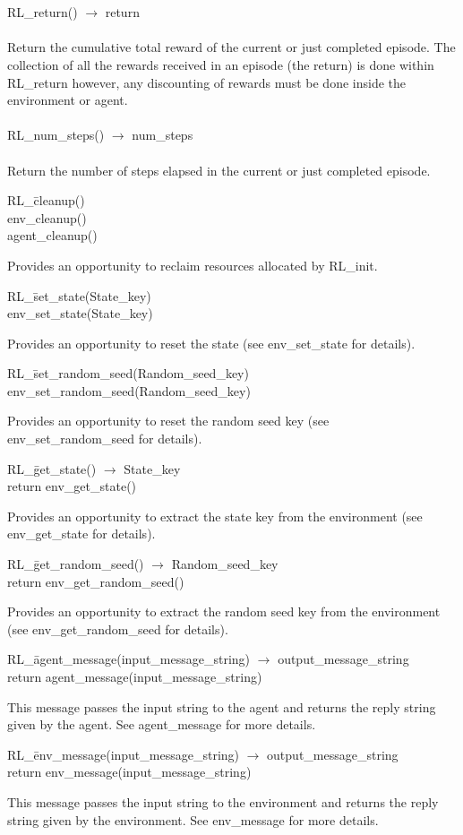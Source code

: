 \documentclass[11pt]{article}
\begin{document}
\\\\
RL\_return() $\rightarrow$ return
\\\\
Return the cumulative total reward of the current or just completed episode.  The collection of all the rewards received in an episode (the return) is done within RL\_return however, any discounting of rewards must be done inside the environment or agent.
\\\\
RL\_num\_steps() $\rightarrow$ num\_steps
\\\\
Return the number of steps elapsed in the current or just completed episode.
\begin{tabbing}
RL\_\=cleanup()\\
\>env\_cleanup()\\
\>agent\_cleanup()
\end{tabbing}
Provides an opportunity to reclaim resources allocated by RL\_init.
\begin{tabbing}
RL\_\=set\_state(State\_key)\\
\>env\_set\_state(State\_key)    
\end{tabbing}
Provides an opportunity to reset the state (see env\_set\_state for details).
\begin{tabbing}
RL\_\=set\_random\_seed(Random\_seed\_key)\\
\>env\_set\_random\_seed(Random\_seed\_key)
\end{tabbing}
Provides an opportunity to reset the random seed key (see env\_set\_random\_seed for details).
\begin{tabbing}
RL\_\=get\_state() $\rightarrow$ State\_key\\
\>return env\_get\_state()  
\end{tabbing}
Provides an opportunity to extract the state key from the environment (see env\_get\_state for details).
\begin{tabbing}
RL\_\=get\_random\_seed() $\rightarrow$ Random\_seed\_key\\
\>return env\_get\_random\_seed()   
\end{tabbing}
Provides an opportunity to extract the random seed key from the environment (see env\_get\_random\_seed for details).               
\begin{tabbing}
RL\_\=agent\_message(input\_message\_string) $\rightarrow$ output\_message\_string\\
\>return agent\_message(input\_message\_string)
\end{tabbing}
This message passes the input string to the agent and returns the reply string given by the agent. See agent\_message for more details.                
\begin{tabbing}
RL\_\=env\_message(input\_message\_string) $\rightarrow$ output\_message\_string\\
\>return env\_message(input\_message\_string)
\end{tabbing}
This message passes the input string to the environment and returns the reply string given by the environment. See env\_message for more details. 
\end{document}
